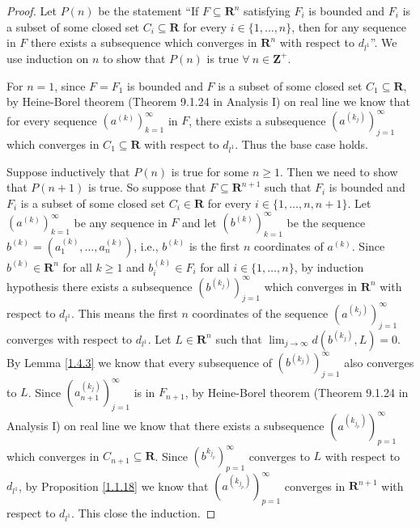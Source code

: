 \begin{proof}
    Let \(P(n)\) be the statement ``If \(F \subseteq \mathbf{R}^n\) satisfying \(F_i\) is bounded and \(F_i\) is a subset of some closed set \(C_i \subseteq \mathbf{R}\) for every \(i \in \{1, \dots, n\}\), then for any sequence in \(F\) there exists a subsequence which converges in \(\mathbf{R}^n\) with respect to \(d_{l^1}\)''.
    We use induction on \(n\) to show that \(P(n)\) is true \(\forall\ n \in \mathbf{Z}^+\).

    For \(n = 1\), since \(F = F_1\) is bounded and \(F\) is a subset of some closed set \(C_1 \subseteq \mathbf{R}\), by Heine-Borel theorem (Theorem 9.1.24 in Analysis I) on real line we know that for every sequence \((a^{(k)})_{k = 1}^\infty\) in \(F\), there exists a subsequence \((a^{(k_j)})_{j = 1}^\infty\) which converges in \(C_1 \subseteq \mathbf{R}\) with respect to \(d_{l^1}\).
    Thus the base case holds.

    Suppose inductively that \(P(n)\) is true for some \(n \geq 1\).
    Then we need to show that \(P(n + 1)\) is true.
    So suppose that \(F \subseteq \mathbf{R}^{n + 1}\) such that \(F_i\) is bounded and \(F_i\) is a subset of some closed set \(C_i \in \mathbf{R}\) for every \(i \in \{1, \dots, n, n + 1\}\).
    Let \((a^{(k)})_{k = 1}^\infty\) be any sequence in \(F\) and let \((b^{(k)})_{k = 1}^\infty\) be the sequence \(b^{(k)} = (a_1^{(k)}, \dots, a_n^{(k)})\), i.e., \(b^{(k)}\) is the first \(n\) coordinates of \(a^{(k)}\).
    Since \(b^{(k)} \in \mathbf{R}^n\) for all \(k \geq 1\) and \(b_i^{(k)} \in F_i\) for all \(i \in \{1, \dots, n\}\), by induction hypothesis there exists a subsequence \((b^{(k_j)})_{j = 1}^\infty\) which converges in \(\mathbf{R}^n\) with respect to \(d_{l^1}\).
    This means the first \(n\) coordinates of the sequence \((a^{(k_j)})_{j = 1}^\infty\) converges with respect to \(d_{l^1}\).
    Let \(L \in \mathbf{R}^n\) such that \(\lim_{j \to \infty} d(b^{(k_j)}, L) = 0\).
    By Lemma \ref{1.4.3} we know that every subsequence of \((b^{(k_j)})_{j = 1}^\infty\) also converges to \(L\).
    Since \((a_{n + 1}^{(k_j)})_{j = 1}^\infty\) is in \(F_{n + 1}\), by Heine-Borel theorem (Theorem 9.1.24 in Analysis I) on real line we know that there exists a subsequence \((a^{(k_{j_p})})_{p = 1}^\infty\) which converges in \(C_{n + 1} \subseteq \mathbf{R}\).
    Since \((b^{k_{j_p}})_{p = 1}^\infty\) converges to \(L\) with respect to \(d_{l^1}\), by Proposition \ref{1.1.18} we know that \((a^{(k_{j_p})})_{p = 1}^\infty\) converges in \(\mathbf{R}^{n + 1}\) with respect to \(d_{l^1}\).
    This close the induction.


\end{proof}
